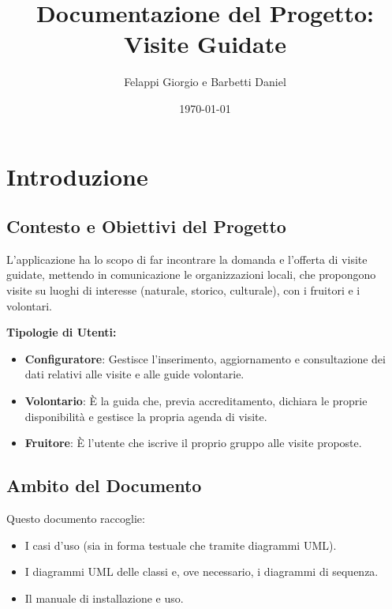 \documentclass[a4paper,12pt]{article}
\title{Documentazione del Progetto: Visite Guidate}
\author{Felappi Giorgio e Barbetti Daniel}
\date{\today}
\begin{document}
    \maketitle
    \tableofcontents
    \newpage


    \section{Introduzione}

    \subsection{Contesto e Obiettivi del Progetto}
    L'applicazione ha lo scopo di far incontrare la domanda e l'offerta di visite guidate, mettendo in comunicazione le organizzazioni locali, che propongono visite su luoghi di interesse (naturale, storico, culturale), con i fruitori e i volontari.

    \bigskip %
    \textbf{Tipologie di Utenti:}
    \begin{itemize}
        \item \textbf{Configuratore}: Gestisce l'inserimento, aggiornamento e consultazione dei dati relativi alle visite e alle guide volontarie.
        \item \textbf{Volontario}: È la guida che, previa accreditamento, dichiara le proprie disponibilità e gestisce la propria agenda di visite.
        \item \textbf{Fruitore}: È l'utente che iscrive il proprio gruppo alle visite proposte.
    \end{itemize}

    \subsection{Ambito del Documento}
    Questo documento raccoglie:
    \begin{itemize}
        \item I casi d'uso (sia in forma testuale che tramite diagrammi UML).
        \item I diagrammi UML delle classi e, ove necessario, i diagrammi di sequenza.
        \item Il manuale di installazione e uso.
    \end{itemize}

    \newpage
\end{document}
